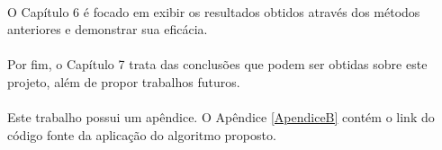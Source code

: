 \paragraph{}O Capítulo 6 é focado em exibir os resultados obtidos através dos métodos anteriores e demonstrar sua eficácia.

\paragraph{}Por fim, o Capítulo 7 trata das conclusões que podem ser obtidas sobre este projeto, além de propor trabalhos futuros.

\paragraph{}Este trabalho possui um apêndice. O Apêndice \ref{ApendiceB} contém o link do código fonte da aplicação do algoritmo proposto.


